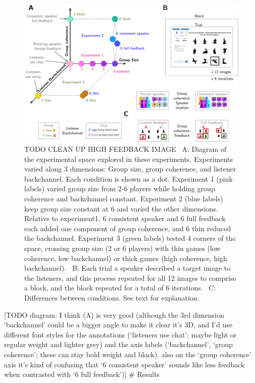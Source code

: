 \documentclass[
  english,
  a4paper,
]{article}
\begin{document}
\begin{figure}[t!]

{\centering \includegraphics[width=1\linewidth]{expt-diagram} 

}

\caption{TODO CLEAN UP HIGH FEEDBACK IMAGE \ A: Diagram of the experimental space explored in these experiments. Experiments varied along 3 dimensions: Group size, group coherence, and listener backchannel. Each condition is shown as a dot. Experiment 1 (pink labels) varied group size from 2-6 players while holding group coherence and backchannel constant. Experiment 2 (blue labels) keep group size constant at 6 and varied the other dimensions. Relative to experiment1, 6 consistent speaker and 6 full feedback each added one component of group coherence, and 6 thin reduced the backchannel. Experiment 3 (green labels) tested 4 corners of the space, crossing group size (2 or 6 players) with thin games (low coherence, low backchannel) or thick games (high coherence, high backchannel). \  B: Each trial a speaker described a target image to the listeners, and this process repeated for all 12 images to comprise a block, and the block repeated for a total of 6 iterations. \ C: Differences between conditions. See text for explanation.}\label{fig:diagram}
\end{figure}

{[}TODO diagram: I think (A) is very good (although the 3rd dimension `backchannel' could be a bigger angle to make it clear it's 3D, and I'd use different font styles for the annotations (`listeners use chat'; maybe light or regular weight and lighter grey) and the axis labels (`backchannel', `group coherence'; these can stay bold weight and black). also on the `group coherence' axis it's kind of confusing that `6 consistent speaker' sounds like less feedback when contrasted with `6 full feedback'){]}
\# Results
\end{document}

